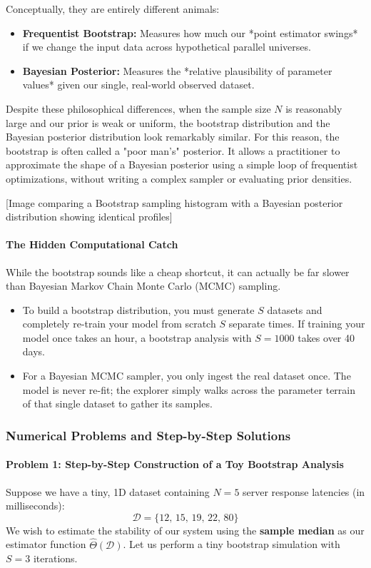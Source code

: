 \documentclass{article}
\begin{document}
Conceptually, they are entirely different animals:
\begin{itemize}
    \item \textbf{Frequentist Bootstrap:} Measures how much our *point estimator swings* if we change the input data across hypothetical parallel universes.
    \item \textbf{Bayesian Posterior:} Measures the *relative plausibility of parameter values* given our single, real-world observed dataset.
\end{itemize}

Despite these philosophical differences, when the sample size $N$ is reasonably large and our prior is weak or uniform, the bootstrap distribution and the Bayesian posterior distribution look remarkably similar. For this reason, the bootstrap is often called a "poor man's" posterior. It allows a practitioner to approximate the shape of a Bayesian posterior using a simple loop of frequentist optimizations, without writing a complex sampler or evaluating prior densities.

[Image comparing a Bootstrap sampling histogram with a Bayesian posterior distribution showing identical profiles]

\paragraph{The Hidden Computational Catch}
While the bootstrap sounds like a cheap shortcut, it can actually be far slower than Bayesian Markov Chain Monte Carlo (MCMC) sampling. 
\begin{itemize}
    \item To build a bootstrap distribution, you must generate $S$ datasets and completely re-train your model from scratch $S$ separate times. If training your model once takes an hour, a bootstrap analysis with $S=1000$ takes over 40 days.
    \item For a Bayesian MCMC sampler, you only ingest the real dataset once. The model is never re-fit; the explorer simply walks across the parameter terrain of that single dataset to gather its samples.
\end{itemize}

\subsubsection{Numerical Problems and Step-by-Step Solutions}

\paragraph{Problem 1: Step-by-Step Construction of a Toy Bootstrap Analysis}
Suppose we have a tiny, 1D dataset containing $N=5$ server response latencies (in milliseconds):
\begin{equation}
\mathcal{D} = \{12, \, 15, \, 19, \, 22, \, 80\}
\end{equation}
We wish to estimate the stability of our system using the \textbf{sample median} as our estimator function $\hat{\Theta}(\mathcal{D})$. Let us perform a tiny bootstrap simulation with $S=3$ iterations. 
\end{document}
